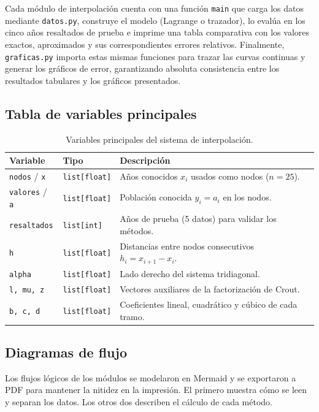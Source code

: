 \documentclass[11pt]{article}
\begin{document}
Cada módulo de interpolación cuenta con una función \texttt{main} que carga los datos mediante \texttt{datos.py}, construye el modelo (Lagrange o trazador), lo evalúa en los cinco años resaltados de prueba e imprime una tabla comparativa con los valores exactos, aproximados y sus correspondientes errores relativos. Finalmente, \texttt{graficas.py} importa estas mismas funciones para trazar las curvas continuas y generar los gráficos de error, garantizando absoluta consistencia entre los resultados tabulares y los gráficos presentados.

\subsection{Tabla de variables principales}
\begin{table}[H]
\centering
\small
\begin{tabular}{|l|l|p{7.5cm}|}
\hline
\textbf{Variable} & \textbf{Tipo} & \textbf{Descripción} \\ \hline
\texttt{nodos} / \texttt{x} & \texttt{list[float]} & Años conocidos $x_i$ usados como nodos ($n=25$). \\ \hline
\texttt{valores} / \texttt{a} & \texttt{list[float]} & Población conocida $y_i = a_i$ en los nodos. \\ \hline
\texttt{resaltados} & \texttt{list[int]} & Años de prueba (5 datos) para validar los métodos. \\ \hline
\texttt{h} & \texttt{list[float]} & Distancias entre nodos consecutivos $h_i = x_{i+1} - x_i$. \\ \hline
\texttt{alpha} & \texttt{list[float]} & Lado derecho del sistema tridiagonal. \\ \hline
\texttt{l, mu, z} & \texttt{list[float]} & Vectores auxiliares de la factorización de Crout. \\ \hline
\texttt{b, c, d} & \texttt{list[float]} & Coeficientes lineal, cuadrático y cúbico de cada tramo. \\ \hline
\end{tabular}
\caption{Variables principales del sistema de interpolación.}
\end{table}

\subsection{Diagramas de flujo}
Los flujos lógicos de los módulos se modelaron en Mermaid y se exportaron a
PDF para mantener la nitidez en la impresión. El primero muestra cómo se leen y
separan los datos. Los otros dos describen el cálculo de cada método.
\end{document}

